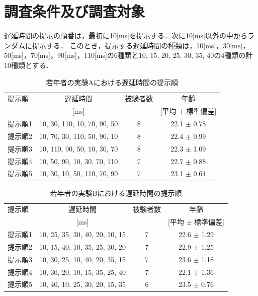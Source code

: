 \section{調査条件及び調査対象}
遅延時間の提示の順番は，最初に10[ms]を提示する．次に10[ms]以外の中からランダムに提示する．
このとき，提示する遅延時間の種類は，10[ms]，30[ms]，50[ms]，70[ms]，90[ms]，110[ms]の6種類と10, 15, 20, 25, 30, 35, 40の4種類の計10種類とする．
\begin{table}[tbp]
  \caption{若年者の実験Aにおける遅延時間の提示順}
  \label{table:young_a}
  \centering
  \begin{tabular}{lccc}
    \hline
    提示順 & 遅延時間 & 被験者数 & 年齢\\
    　& [ms] & & [平均 $\pm$ 標準偏差]\\
    \hline \hline
    提示順1  & 10, 30, 110, 10, 70, 90, 50  & 8 & 22.1 $\pm$ 0.78\\
    提示順2  & 10, 70, 30, 110, 50, 90, 10  & 8 & 22.4 $\pm$ 0.99\\
    提示順3  & 10, 110, 90, 50, 10, 30, 70  & 8 & 22.3 $\pm$ 1.09\\
    提示順4  & 10, 50, 90, 10, 30, 70, 110  & 7 & 22.7 $\pm$ 0.88\\
    提示順5  & 10, 30, 10, 50, 110, 70, 90  & 7 & 23.1 $\pm$ 0.64
\\
    \hline
  \end{tabular}
\end{table}
\begin{table}[tbp]
  \caption{若年者の実験Bにおける遅延時間の提示順}
  \label{table:young_b}
  \centering
  \begin{tabular}{lccc}
    \hline
    提示順 & 遅延時間 & 被験者数 & 年齢\\
    　& [ms] & & [平均 $\pm$ 標準偏差]\\
    \hline \hline
    提示順1  & 10, 25, 35, 30, 40, 20, 10, 15  & 7 & 22.6 $\pm$ 1.29\\
    提示順2  & 10, 15, 40, 10, 35, 25, 30, 20  & 7 & 22.9 $\pm$ 1.25\\
    提示順3  & 10, 30, 25, 10, 40, 20, 35, 15  & 7 & 23.6 $\pm$ 1.18\\
    提示順4  & 10, 30, 20, 10, 15, 35, 25, 40  & 7 & 22.1 $\pm$ 1.36\\
    提示順5  & 10, 40, 10, 25, 30, 20, 15, 35  & 6 & 23.5 $\pm$ 0.76
\\
    \hline
  \end{tabular}
\end{table}
